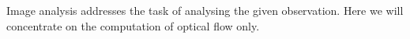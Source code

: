 \documentclass[enabledeprecatedfontcommands,cleardoublepage=empty,headsepline,twoside,11pt,DIV=15,BCOR=12mm,final]{scrartcl}
\newcommand{\R}{{\mathbb R}}
\begin{document}
Image analysis addresses the task of analysing the given observation. Here we will concentrate on  the computation of optical flow only. 
%
\end{document}
